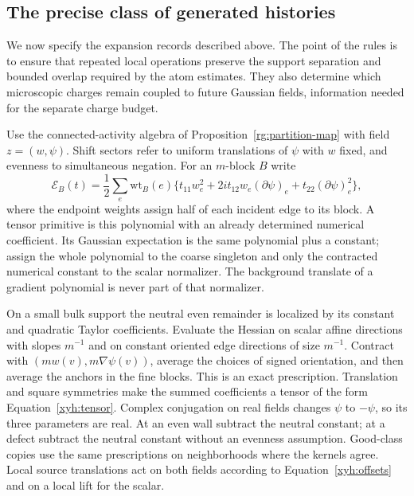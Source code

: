 \subsection{The precise class of generated histories}

We now specify the expansion records described above.  The point of
the rules is to ensure that repeated local operations preserve the
support separation and bounded overlap required by the atom estimates.
They also determine which microscopic charges remain coupled to future
Gaussian fields, information needed for the separate charge budget.

Use the connected-activity algebra of Proposition~\ref{rg:partition-map}
with field $z=(w,\psi)$. Shift sectors refer to uniform translations of
$\psi$ with $w$ fixed, and evenness to simultaneous negation. For an
$m$-block $B$ write
\begin{equation}\label{xyh:tensor}
 \mathcal E_B(t)=\frac12\sum_e\mathrm{wt}_B(e)
 \{t_{11}w_e^2+2i t_{12}w_e(\partial\psi)_e
                         +t_{22}(\partial\psi)_e^2\},
\end{equation}
where the endpoint weights assign half of each incident edge to its block.
A tensor primitive is this polynomial with an already determined numerical
coefficient. Its Gaussian expectation is the same polynomial plus a
constant; assign the whole polynomial to the coarse singleton and only
the contracted numerical constant to the scalar normalizer. The
background translate of a gradient polynomial is never part of that
normalizer.

On a small bulk support the neutral even remainder is localized by its
constant and quadratic Taylor coefficients. Evaluate the Hessian on
scalar affine directions with slopes $m^{-1}$ and on constant oriented
edge directions of size $m^{-1}$. Contract with
$(m w(v),m\nabla\psi(v))$, average the choices of signed orientation,
and then average the anchors in the fine blocks. This is an exact
prescription. Translation and square symmetries make the summed
coefficients a tensor of the form Equation~\eqref{xyh:tensor}. Complex
conjugation on real fields changes $\psi$ to $-\psi$, so its three
parameters are real. At an even wall subtract the neutral constant;
at a defect subtract the neutral constant without an evenness assumption.
Good-class copies use the same prescriptions on neighborhoods where the
kernels agree. Local source translations act on both fields according to
Equation~\eqref{xyh:offsets} and on a local lift for the scalar.

